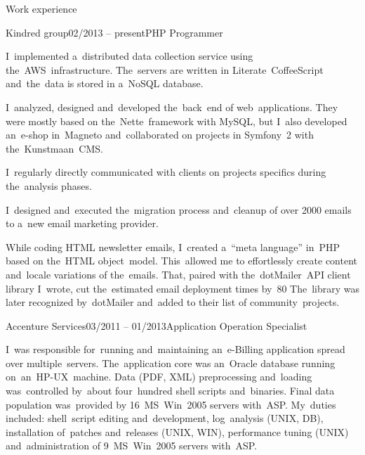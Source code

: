 \documentclass{resume}
\begin{document}
    \begin{rSection}{Work experience}

        \begin{rSubsection}{Kindred group}{02/2013 -- present}{PHP Programmer}{}

            \item I~implemented a~distributed data collection service using the~AWS~infrastructure.
            The~servers are written in Literate~CoffeeScript and~the~data is stored in a~NoSQL database.

            \item I~analyzed, designed and~developed the~back~end of web~applications.
            They were mostly based on the~Nette~framework with MySQL,
            but I~also developed an~e-shop in~Magneto and~collaborated on projects in Symfony~2 with the~Kunstmaan~CMS.

            \item I~regularly directly communicated with clients on projects specifics during the~analysis phases.

            \item I~designed and~executed the~migration process and~cleanup of over 2000 emails to a~new email marketing provider.

            \item While coding HTML newsletter emails, I~created a~“meta language” in~PHP based on the~HTML object~model.
            This~allowed me to effortlessly create content and~locale variations of the~emails.
            That, paired with the~dotMailer~API client library I~wrote, cut the~estimated email deployment times by~80%
            The~library was later recognized by~dotMailer and~added to their list of community~projects.
        \end{rSubsection}

        \begin{rSubsection}{Accenture Services}{03/2011 -- 01/2013}{Application Operation Specialist}{}
            \item I~was responsible for~running and~maintaining an~e-Billing application spread over multiple~servers.
            The~application core was an~Oracle database running on~an~HP-UX~machine.
            Data (PDF, XML) preprocessing and~loading was~controlled by~about four~hundred shell scripts and~binaries.
            Final data population was~provided by 16~MS~Win~2005 servers with~ASP.
            My~duties included: shell~script editing and~development, log~analysis (UNIX, DB),
            installation of~patches and~releases (UNIX, WIN), performance tuning (UNIX)
            and~administration of 9~MS~Win~2005 servers with~ASP.


\end{rSubsection}
\end{rSection}
\end{document}
